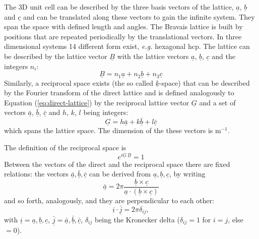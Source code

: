 \documentclass[11pt,DIV=13,BCOR=5mm,a4paper,headinclude]{scrbook}
\renewcommand{\vec}[1]{\underline{#1}}
\begin{document}
The 3D unit cell can be described by the three basis vectors of the lattice, $\vec{a}$, $\vec{b}$ and $\vec{c}$ and can be translated along these vectors to gain the infinite system.
They span the space with defined length and angles.
The Bravais lattice is built by positions that are repeated periodically by the translational vectors.
In three dimensional systems 14 different form exist, \textit{e.g.} hexagonal hcp.
The lattice can be described by the lattice vector $\vec{B}$ with the lattice vectors $\vec{a}$, $\vec{b}$, $\vec{c}$ and the integers $n_i$:
\begin{equation}\label{eq:direct-lattice}
 \vec{B}=n_1\vec{a}+n_2\vec{b}+n_3\vec{c}
\end{equation}
Similarly, a reciprocal space exists (the so called $\vec{k}$-space) that can be described by the Fourier transform of the direct lattice and is defined analogously to Equation (\ref{eq:direct-lattice}) by the reciprocal lattice vector $\vec{G}$ and a set of vectors $\bar{\vec{a}}$, $\bar{\vec{b}}$, $\bar{\vec{c}}$ and $h$, $k$, $l$ being integers:
\begin{equation}\label{eq:rec_latt_vec}
 \vec{G}=h\bar{\vec{a}}+k\bar{\vec{b}}+l\bar{\vec{c}}
\end{equation}
which spans the lattice space.
The dimension of the these vectors is m$^{-1}$.

The definition of the reciprocal space is
\begin{equation}
 e^{i\vec{G}\,\vec{B}}=1
\end{equation}
Between the vectors of the direct and the reciprocal space there are fixed relations: the vectors $\bar{\vec{a}},\bar{\vec{b}},\bar{\vec{c}}$  can be derived from $\vec{a},\vec{b},\vec{c}$, by writing
\begin{equation}
\bar{\vec{a}}=2\pi\frac{\vec{b} \times \vec{c}}{\vec{a}\cdot(\vec{b} \times \vec{c})} 
\end{equation}
and so forth, analogously, and they are perpendicular to each other:
\begin{equation}
 \vec{i}\cdot\bar{\vec{j}}=2\pi\delta_{ij},
\end{equation} 
with $\vec{i}=\vec{a}, \vec{b}, \vec{c}$, $\bar{\vec{j}}=\bar{\vec{a}},\bar{\vec{b}},\bar{\vec{c}}$, $\delta_{ij}$ being the Kronecker delta ($\delta_{ij}=1$ for $i=j$, else $=0$).
\end{document}
